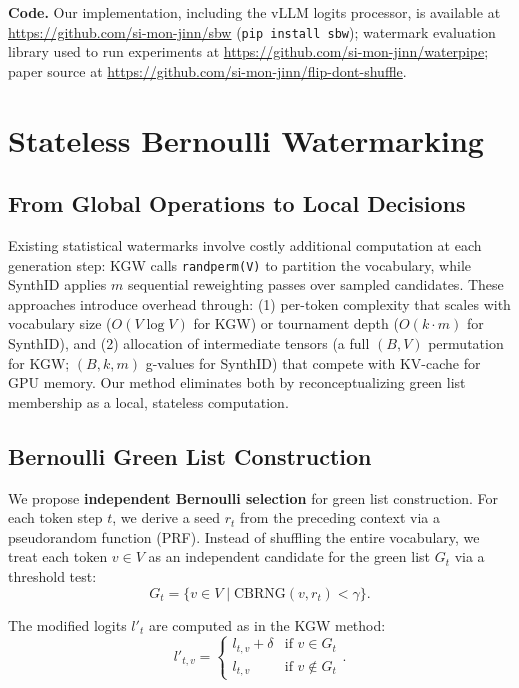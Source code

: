\documentclass[11pt]{article}
\begin{document}
\textbf{Code.} Our implementation, including the vLLM logits processor, is available at \url{https://github.com/si-mon-jinn/sbw} (\texttt{pip install sbw}); watermark evaluation library used to run experiments at \url{https://github.com/si-mon-jinn/waterpipe}; paper source at \url{https://github.com/si-mon-jinn/flip-dont-shuffle}.


\section{Stateless Bernoulli Watermarking}
\label{sec:method}

\subsection{From Global Operations to Local Decisions}

Existing statistical watermarks involve costly additional computation at each generation step: KGW calls \texttt{randperm(V)} to partition the vocabulary, while SynthID applies $m$ sequential reweighting passes over sampled candidates. These approaches introduce overhead through: (1) per-token complexity that scales with vocabulary size ($O(V \log V)$ for KGW) or tournament depth ($O(k \cdot m)$ for SynthID), and (2) allocation of intermediate tensors (a full $(B, V)$ permutation for KGW; $(B, k, m)$ g-values for SynthID) that compete with KV-cache for GPU memory. Our method eliminates both by reconceptualizing green list membership as a local, stateless computation. %

\subsection{Bernoulli Green List Construction}

We propose \textbf{independent Bernoulli selection} for green list construction. For each token step $t$, we derive a seed $r_t$ from the preceding context via a pseudorandom function (PRF). Instead of shuffling the entire vocabulary, we treat each token $v \in V$ as an independent candidate for the green list $G_t$ via a threshold test:
\begin{equation}
G_t = \{ v \in V \mid \text{CBRNG}(v, r_t) < \gamma \}.
\end{equation}

The modified logits $l'_t$ are computed as in the KGW method:
\begin{equation}
l'_{t,v} = \begin{cases} l_{t,v} + \delta & \text{if } v \in G_t \\ l_{t,v} & \text{if } v \notin G_t \end{cases}.
\end{equation}
\end{document}
